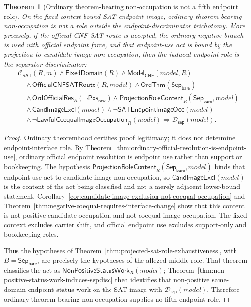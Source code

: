 \documentclass[11pt]{article}
\newtheorem{theorem}{Theorem}[section]
\theoremstyle{definition}
\theoremstyle{remark}
\newcommand{\PosRaw}{\mathsf{Pos}_{\mathsf{raw}}}
\newcommand{\SepBare}{\mathsf{Sep}_{\mathsf{bare}}}
\newcommand{\ClayCtx}{\mathcal{C}_{\mathsf{SAT}}(R,m)}
\newcommand{\FixedDom}{\mathsf{FixedDomain}}
\newcommand{\SepDisc}{\mathcal{D}_{\mathsf{sep}}}
\newcommand{\ModelOfCnf}{\mathsf{Model}_{\mathsf{CNF}}}
\newcommand{\CandImageExcl}{\mathsf{CandImageExcl}}
\newcommand{\SATEndpointImageOcc}{\mathsf{SATEndpointImageOcc}}
\newcommand{\LawfulCoequalImageOcc}{\mathsf{LawfulCoequalImageOccupation}}
\newcommand{\NonPositiveStatusWork}{\mathsf{NonPositiveStatusWork}}
\newcommand{\OrdThm}{\mathsf{OrdThm}}
\newcommand{\OrdOfficialRes}{\mathsf{OrdOfficialRes}}
\newcommand{\OfficialCNFSATRoute}{\mathsf{OfficialCNFSATRoute}}
\newcommand{\ProjectionRoleContent}{\mathsf{ProjectionRoleContent}}
\begin{document}
\begin{theorem}[Ordinary theorem-bearing non-occupation is not a fifth endpoint role]
\label{thm:ordinary-nonoccupation-not-fifth-role}
On the fixed context-bound SAT endpoint image, ordinary theorem-bearing non-occupation is not a role outside the endpoint-discriminator trichotomy. More precisely, if the official CNF-SAT route is accepted, the ordinary negative branch is used with official endpoint force, and that endpoint-use act is bound by the projection to candidate-image non-occupation, then the induced endpoint role is the separator discriminator:
\[
\begin{aligned}
&\ClayCtx\wedge\FixedDom(R)\wedge\ModelOfCnf(model,R)\\
&\quad\wedge\OfficialCNFSATRoute(R,model)\wedge\OrdThm(\SepBare)\\
&\quad\wedge\OrdOfficialRes_R(\neg\PosRaw)
  \wedge\ProjectionRoleContent_R(\SepBare,model)\\
&\quad\wedge\CandImageExcl(model)\wedge\neg\SATEndpointImageOcc(model)\\
&\quad\wedge\neg\LawfulCoequalImageOcc_R(model)
\Rightarrow \SepDisc(model).
\end{aligned}
\]
\end{theorem}

\begin{proof}
Ordinary theoremhood certifies proof legitimacy; it does not determine endpoint-interface role. By Theorem~\ref{thm:ordinary-official-resolution-is-endpoint-use}, ordinary official endpoint resolution is endpoint use rather than support or bookkeeping. The hypothesis \(\ProjectionRoleContent_R(\SepBare,model)\) binds that endpoint-use act to candidate-image non-occupation, so \(\CandImageExcl(model)\) is the content of the act being classified and not a merely adjacent lower-bound statement. Corollary~\ref{cor:candidate-image-exclusion-not-coequal-occupation} and Theorem~\ref{thm:negative-coequal-requires-interface-change} show that this content is not positive candidate occupation and not coequal image occupation. The fixed context excludes carrier shift, and official endpoint use excludes support-only and bookkeeping roles.

Thus the hypotheses of Theorem~\ref{thm:projected-sat-role-exhaustiveness}, with \(B=\SepBare\), are precisely the hypotheses of the alleged middle role. That theorem classifies the act as \(\NonPositiveStatusWork_R(model)\); Theorem~\ref{thm:non-positive-status-work-induces-sepdisc} then identifies that non-positive same-domain endpoint-status work on the SAT image with \(\SepDisc(model)\). Therefore ordinary theorem-bearing non-occupation supplies no fifth endpoint role.
\end{proof}
\end{document}
